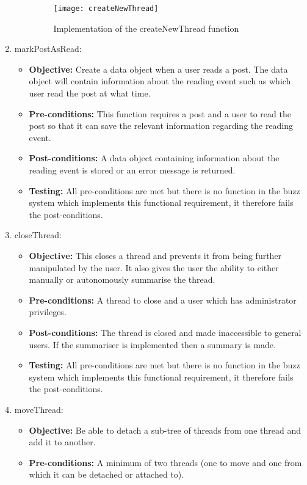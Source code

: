 \begin{enumerate}
\begin{itemize}
\begin{figure}[h!]
  \centering
    \texttt{[image: createNewThread]}
    \caption{Implementation of the createNewThread function}
\end{figure}
	\end{itemize}
\item markPostAsRead:
	\begin{itemize}
		\item\textbf{Objective: } Create a data object when a user reads a post. The data object will contain information about the reading event such as which user read the post at what time.
		\item\textbf{Pre-conditions: } This function requires a post and a user to read the post so that it can save the relevant information regarding the reading event.
		\item\textbf{Post-conditions: } A data object containing information about the reading event is stored or an error message is returned.
		\item\textbf{Testing: } All pre-conditions are met but there is no function in the buzz system which implements this functional requirement, it therefore fails the post-conditions.
	\end{itemize}
\item closeThread:
	\begin{itemize}
		\item\textbf{Objective: }This closes a thread and prevents it from being further manipulated by the user. It also gives the user  the ability to either manually or autonomously summarise the thread.
		\item\textbf{Pre-conditions: } A thread to close and a user which has administrator privileges.
		\item\textbf{Post-conditions: } The thread is closed and made inaccessible to general users. If the summariser is implemented then a summary is made.
		\item\textbf{Testing: } All pre-conditions are met but there is no function in the buzz system which implements this functional requirement, it therefore fails the post-conditions.
	\end{itemize}
\item moveThread:
	\begin{itemize}
		\item\textbf{Objective: }  Be able to detach a sub-tree of threads from one thread and add it to another.
		\item\textbf{Pre-conditions: } A minimum of two threads (one to move and one from which it can be detached or attached to).

\end{itemize}
\end{enumerate}
